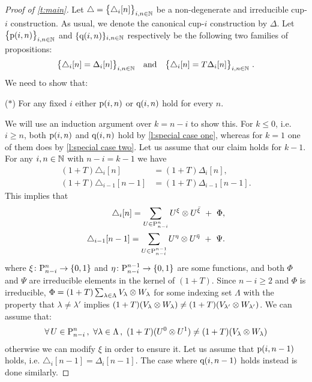\begin{proof}[Proof of \cref{t:main}]
	Let $\triangle = \set[\big]{\triangle_i [n]}_{i,n\in\N}$ be a non-degenerate and irreducible \mbox{cup-$i$} construction.
	As usual, we denote the canonical cup-$i$ construction by $\Delta$.
	Let $\set[\big]{\p(i,n)}_{i,n \in \N}$ and $\set{\q(i,n)}_{i,n \in \N}$ respectively be the following two families of propositions:
	\[
	\set[\big]{\triangle_i [n] = \Delta_ i [n]}_{i,n \in \N}
	\quad \text{and} \quad
	\set[\big]{\triangle_i [n] = T \Delta_ i [n]}_{i,n \in \N} \ .
	\]
	We need to show that:
	\begin{center}
		($\ast$) For any fixed $i$ either $\p(i,n)$ or $\q(i,n)$ hold for every $n$.
	\end{center}
	We will use an induction argument over $k = n-i$ to show this.
	For $k \leq 0$, i.e. $i \geq n$, both $\p(i,n)$ and $\q(i,n)$ hold by \cref{l:special case one}, whereas for $k = 1$ one of them does by \cref{l:special case two}.
	Let us assume that our claim holds for $k-1$.
	For any $i,n \in \N$ with $n-i = k-1$ we have
	\begin{align}
		\label{eq:z}  (1+T)\triangle_i[n] &= (1+T)\Delta_i[n],\\
		\label{eq:zz} (1+T)\triangle_{i-1}[n-1] &= (1+T)\Delta_{i-1}[n-1].
	\end{align}
	This implies that
	\begin{align}
		\triangle_i[n] = \sum_{U \in \P_{n-i}^n} U^{\xi} \ot U^{\barxi} \ + \ \Phi, \\
		\triangle_{i-1}[n-1] = \sum_{U \in \P_{n-i}^{n-1}} U^{\eta} \ot U^{\bareta} \ + \ \Psi.
	\end{align}
	where $\xi \colon \P_{n-i}^n \to \set{0,1}$ and $\eta \colon \P_{n-i}^{n-1} \to \set{0,1}$ are some functions, and both $\Phi$ and $\Psi$ are irreducible elements in the kernel of $(1+T)$.
	Since $n-i \geq 2$ and $\Phi$ is irreducible, $\Phi = (1+T) \sum_{\lambda \in \Lambda} V_\lambda \ot W_\lambda$ for some indexing set $\Lambda$ with the property that $\lambda \neq \lambda'$ implies $(1+T)(V_\lambda \ot W_\lambda) \neq (1+T)(V_{\lambda'} \ot W_{\lambda'})$.
	We can assume that:
	\begin{equation}\label{eq:form of Phi}
		\forall\, U \in \P_{n-i}^n\,,\  \forall \lambda \in \Lambda\,,\ (1+T)(U^0 \ot U^1) \neq (1+T)(V_\lambda \ot W_\lambda)
	\end{equation}
	otherwise we can modify $\xi$ in order to ensure it.
	Let us assume that $\p(i,n-1)$ holds, i.e. $\triangle_i[n-1] = \Delta_i[n-1]$.
	The case where $\q(i,n-1)$ holds instead is done similarly.

\end{proof}
